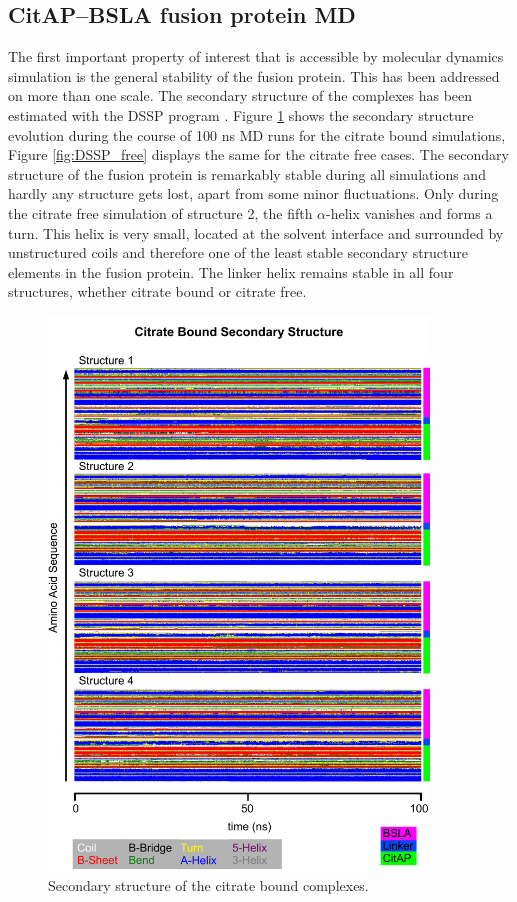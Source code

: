 \documentclass[english, a4paper, 12pt, titlepage, draft]{article}
\begin{document}
\subsection{CitAP--BSLA fusion protein MD}

The first important property of interest that is accessible by molecular dynamics simulation is the general stability of the fusion protein.
This has been addressed on more than one scale.
The secondary structure of the complexes has been estimated with the DSSP program \cite{DSSPalgorithm, DSSPwebsite}.
Figure \ref{fig:DSSP_bound} shows the secondary structure evolution during the course of 100 ns MD runs for the citrate bound simulations, Figure \ref{fig:DSSP_free} displays the same for the citrate free cases.
The secondary structure of the fusion protein is remarkably stable during all simulations and hardly any structure gets lost, apart from some minor fluctuations.
Only during the citrate free simulation of structure 2, the fifth $\alpha$-helix vanishes and forms a turn.
This helix is very small, located at the solvent interface and surrounded by unstructured coils and therefore one of the least stable secondary structure elements in the fusion protein.
The linker helix remains stable in all four structures, whether citrate bound or citrate free.


\begin{figure}
    \centering
    \includegraphics[width=0.9\textwidth]{figures/DSSP/dssp_bound.pdf}
    \caption{Secondary structure of the citrate bound complexes.}
    \label{fig:DSSP_bound}
\end{figure}          
\end{document}
